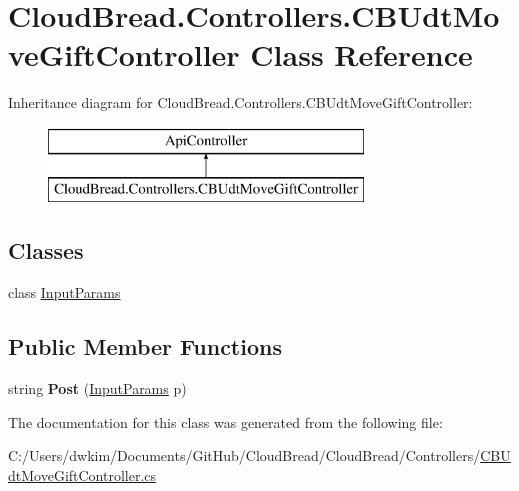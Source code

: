 \hypertarget{a00060}{}\section{Cloud\+Bread.\+Controllers.\+C\+B\+Udt\+Move\+Gift\+Controller Class Reference}
\label{a00060}
Inheritance diagram for Cloud\+Bread.\+Controllers.\+C\+B\+Udt\+Move\+Gift\+Controller\+:\begin{figure}[H]
\begin{center}
\leavevmode
\includegraphics[height=2.000000cm]{a00060}
\end{center}
\end{figure}
\subsection*{Classes}
\begin{DoxyCompactItemize}
\item 
class \hyperlink{a00113}{Input\+Params}
\end{DoxyCompactItemize}
\subsection*{Public Member Functions}
\begin{DoxyCompactItemize}
\item 
string {\bfseries Post} (\hyperlink{a00113}{Input\+Params} p)\hypertarget{a00060_aad6fd43621468113744b17a91072aa13}{}\label{a00060_aad6fd43621468113744b17a91072aa13}

\end{DoxyCompactItemize}


The documentation for this class was generated from the following file\+:\begin{DoxyCompactItemize}
\item 
C\+:/\+Users/dwkim/\+Documents/\+Git\+Hub/\+Cloud\+Bread/\+Cloud\+Bread/\+Controllers/\hyperlink{a00231}{C\+B\+Udt\+Move\+Gift\+Controller.\+cs}\end{DoxyCompactItemize}
